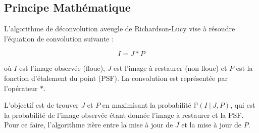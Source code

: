 \subsection{Principe Mathématique}

L'algorithme de déconvolution aveugle de Richardson-Lucy vise à résoudre l'équation de convolution suivante :

\begin{equation}
    I = J \ast P
\end{equation}

où \( I \) est l'image observée (floue), \( J \) est l'image à restaurer (non floue) et \( P \) est la fonction d'étalement du point (PSF). La convolution est représentée par l'opérateur \( \ast \).

L'objectif est de trouver \( J \) et \( P \) en maximisant la probabilité \( \mathbb{P}(I \ | \ J, P) \), qui est la probabilité de l'image observée étant donnée l'image à restaurer et la PSF. 
Pour ce faire, l'algorithme itère entre la mise à jour de \( J \) et la mise à jour de \( P \).